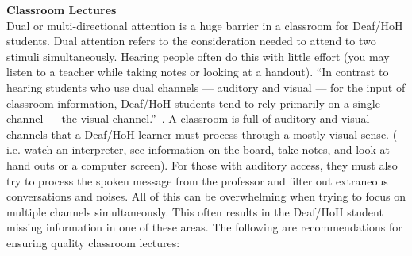 \documentclass[conference]{IEEEtran}
\begin{document}
\noindent
\textbf{Classroom Lectures}\\
Dual or multi-directional attention is a huge barrier in a classroom for Deaf/HoH students. Dual attention refers to the consideration needed to attend to two stimuli simultaneously. Hearing people often do this with little effort (you may listen to a teacher while taking notes or looking at a handout). ``In contrast to hearing students who use dual channels --- auditory and visual --- for the input of classroom information, Deaf/HoH students tend to rely primarily on a single channel --- the visual channel.''~\cite{anissueoflearning_bibtex}. A classroom is full of auditory and visual channels that a Deaf/HoH learner must process through a mostly visual sense. ( i.e. watch an interpreter, see information on the board, take notes, and look at hand outs or a computer screen). For those with auditory access, they must also try to process the spoken message from the professor and filter out extraneous conversations and noises. All of this can be overwhelming when trying to focus on multiple channels simultaneously. This often results in the Deaf/HoH student missing information in one of these areas. The following are recommendations for ensuring quality classroom lectures:
\end{document}
